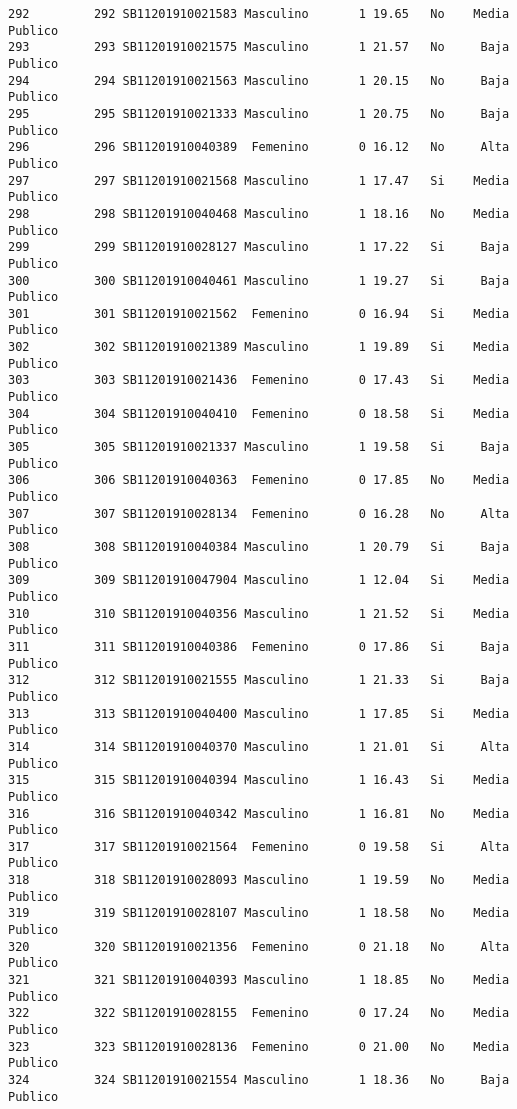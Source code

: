 \documentclass[
  letterpaper,
  DIV=11,
  numbers=noendperiod]{scrartcl}
\begin{document}
\begin{verbatim}
292         292 SB11201910021583 Masculino       1 19.65   No    Media Publico
293         293 SB11201910021575 Masculino       1 21.57   No     Baja Publico
294         294 SB11201910021563 Masculino       1 20.15   No     Baja Publico
295         295 SB11201910021333 Masculino       1 20.75   No     Baja Publico
296         296 SB11201910040389  Femenino       0 16.12   No     Alta Publico
297         297 SB11201910021568 Masculino       1 17.47   Si    Media Publico
298         298 SB11201910040468 Masculino       1 18.16   No    Media Publico
299         299 SB11201910028127 Masculino       1 17.22   Si     Baja Publico
300         300 SB11201910040461 Masculino       1 19.27   Si     Baja Publico
301         301 SB11201910021562  Femenino       0 16.94   Si    Media Publico
302         302 SB11201910021389 Masculino       1 19.89   Si    Media Publico
303         303 SB11201910021436  Femenino       0 17.43   Si    Media Publico
304         304 SB11201910040410  Femenino       0 18.58   Si    Media Publico
305         305 SB11201910021337 Masculino       1 19.58   Si     Baja Publico
306         306 SB11201910040363  Femenino       0 17.85   No    Media Publico
307         307 SB11201910028134  Femenino       0 16.28   No     Alta Publico
308         308 SB11201910040384 Masculino       1 20.79   Si     Baja Publico
309         309 SB11201910047904 Masculino       1 12.04   Si    Media Publico
310         310 SB11201910040356 Masculino       1 21.52   Si    Media Publico
311         311 SB11201910040386  Femenino       0 17.86   Si     Baja Publico
312         312 SB11201910021555 Masculino       1 21.33   Si     Baja Publico
313         313 SB11201910040400 Masculino       1 17.85   Si    Media Publico
314         314 SB11201910040370 Masculino       1 21.01   Si     Alta Publico
315         315 SB11201910040394 Masculino       1 16.43   Si    Media Publico
316         316 SB11201910040342 Masculino       1 16.81   No    Media Publico
317         317 SB11201910021564  Femenino       0 19.58   Si     Alta Publico
318         318 SB11201910028093 Masculino       1 19.59   No    Media Publico
319         319 SB11201910028107 Masculino       1 18.58   No    Media Publico
320         320 SB11201910021356  Femenino       0 21.18   No     Alta Publico
321         321 SB11201910040393 Masculino       1 18.85   No    Media Publico
322         322 SB11201910028155  Femenino       0 17.24   No    Media Publico
323         323 SB11201910028136  Femenino       0 21.00   No    Media Publico
324         324 SB11201910021554 Masculino       1 18.36   No     Baja Publico

\end{verbatim}
\end{document}
